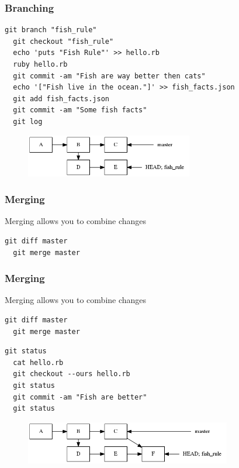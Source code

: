 \documentclass{beamer}
\begin{document}
\begin{frame}[fragile]
\frametitle{Branching}

\begin{lstlisting}[frame=single]
  git branch "fish_rule"
  git checkout "fish_rule"
  echo 'puts "Fish Rule"' >> hello.rb
  ruby hello.rb
  git commit -am "Fish are way better then cats"
  echo '["Fish live in the ocean."]' >> fish_facts.json
  git add fish_facts.json
  git commit -am "Some fish facts"
  git log
\end{lstlisting}

\begin{figure}[p]
  \centering
  \includegraphics[height=5em]{fish.png}
\end{figure}

\end{frame}


\begin{frame}[fragile]
\frametitle{Merging}

Merging allows you to combine changes

\vspace{1em}

\begin{lstlisting}[frame=single]
  git diff master
  git merge master
\end{lstlisting}

\end{frame}

\begin{frame}[fragile]
\frametitle{Merging}

Merging allows you to combine changes

\vspace{1em}

\begin{lstlisting}[frame=single]
  git diff master
  git merge master
\end{lstlisting}

\vspace{1em}

\begin{lstlisting}[frame=single]
  git status
  cat hello.rb
  git checkout --ours hello.rb 
  git status
  git commit -am "Fish are better"
  git status
\end{lstlisting}

\begin{figure}[p]
  \centering
  \includegraphics[height=5em]{merge.png}
\end{figure}

\end{frame}
\end{document}
